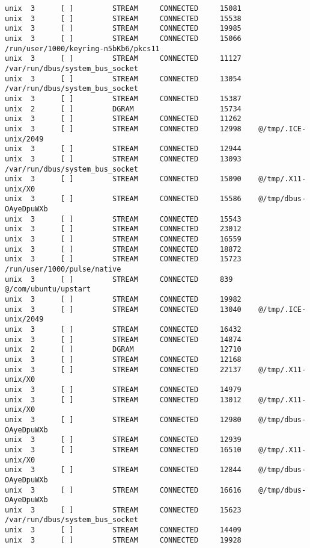 \begin{lstlisting}
unix  3      [ ]         STREAM     CONNECTED     15081    
unix  3      [ ]         STREAM     CONNECTED     15538    
unix  3      [ ]         STREAM     CONNECTED     19985    
unix  3      [ ]         STREAM     CONNECTED     15066    /run/user/1000/keyring-n5bKb6/pkcs11
unix  3      [ ]         STREAM     CONNECTED     11127    /var/run/dbus/system_bus_socket
unix  3      [ ]         STREAM     CONNECTED     13054    /var/run/dbus/system_bus_socket
unix  3      [ ]         STREAM     CONNECTED     15387    
unix  2      [ ]         DGRAM                    15734    
unix  3      [ ]         STREAM     CONNECTED     11262    
unix  3      [ ]         STREAM     CONNECTED     12998    @/tmp/.ICE-unix/2049
unix  3      [ ]         STREAM     CONNECTED     12944    
unix  3      [ ]         STREAM     CONNECTED     13093    /var/run/dbus/system_bus_socket
unix  3      [ ]         STREAM     CONNECTED     15090    @/tmp/.X11-unix/X0
unix  3      [ ]         STREAM     CONNECTED     15586    @/tmp/dbus-OAyeDpuWXb
unix  3      [ ]         STREAM     CONNECTED     15543    
unix  3      [ ]         STREAM     CONNECTED     23012    
unix  3      [ ]         STREAM     CONNECTED     16559    
unix  3      [ ]         STREAM     CONNECTED     18872    
unix  3      [ ]         STREAM     CONNECTED     15723    /run/user/1000/pulse/native
unix  3      [ ]         STREAM     CONNECTED     839      @/com/ubuntu/upstart
unix  3      [ ]         STREAM     CONNECTED     19982    
unix  3      [ ]         STREAM     CONNECTED     13040    @/tmp/.ICE-unix/2049
unix  3      [ ]         STREAM     CONNECTED     16432    
unix  3      [ ]         STREAM     CONNECTED     14874    
unix  2      [ ]         DGRAM                    12710    
unix  3      [ ]         STREAM     CONNECTED     12168    
unix  3      [ ]         STREAM     CONNECTED     22137    @/tmp/.X11-unix/X0
unix  3      [ ]         STREAM     CONNECTED     14979    
unix  3      [ ]         STREAM     CONNECTED     13012    @/tmp/.X11-unix/X0
unix  3      [ ]         STREAM     CONNECTED     12980    @/tmp/dbus-OAyeDpuWXb
unix  3      [ ]         STREAM     CONNECTED     12939    
unix  3      [ ]         STREAM     CONNECTED     16510    @/tmp/.X11-unix/X0
unix  3      [ ]         STREAM     CONNECTED     12844    @/tmp/dbus-OAyeDpuWXb
unix  3      [ ]         STREAM     CONNECTED     16616    @/tmp/dbus-OAyeDpuWXb
unix  3      [ ]         STREAM     CONNECTED     15623    /var/run/dbus/system_bus_socket
unix  3      [ ]         STREAM     CONNECTED     14409    
unix  3      [ ]         STREAM     CONNECTED     19928    

\end{lstlisting}
